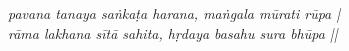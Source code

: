{\vspace{1em}

\begin{center}
    \begin{minipage}{0.8\linewidth}
        \centering
        \large \textit{pavana tanaya saṅkaṭa harana, maṅgala mūrati rūpa |} \\ 
        \large \textit{rāma lakhana sītā sahita, hṛdaya basahu sura bhūpa ||}
    \end{minipage}
\end{center}

} %
\restoregeometry
\newpage
